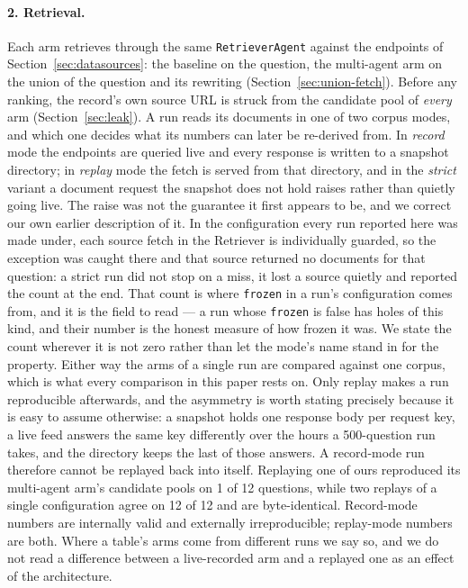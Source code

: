 \documentclass[acmsmall,anonymous,screen]{acmart}
\begin{document}
\paragraph{2. Retrieval.} Each arm retrieves through the same
\texttt{RetrieverAgent} against the endpoints of
Section~\ref{sec:datasources}: the baseline on the question, the multi-agent
arm on the union of the question and its rewriting
(Section~\ref{sec:union-fetch}). Before any ranking, the record's own source
URL is struck from the candidate pool of \emph{every} arm
(Section~\ref{sec:leak}). A run reads its documents in one of two corpus
modes, and which one decides what its numbers can later be re-derived from. In
\emph{record} mode the endpoints are queried live and every response is written
to a snapshot directory; in \emph{replay} mode the fetch is served from that
directory, and in the \emph{strict} variant a document request the snapshot
does not hold raises rather than quietly going live. The raise was not the
guarantee it first appears to be, and we correct our own earlier description of
it. In the configuration every run reported here was made under, each source
fetch in the Retriever is individually guarded, so the exception was caught
there and that source returned no documents for that question: a strict run did
not stop on a miss, it lost a source quietly and reported the count at the end.
That count is where \texttt{frozen} in a run's configuration comes from, and it
is the field to read --- a run whose \texttt{frozen} is false has holes of this
kind, and their number is the honest measure of how frozen it was. We state the
count wherever it is not zero rather than let the mode's name stand in for the
property. Either way the
arms of a single run are compared against one corpus, which is what every
comparison in this paper rests on. Only replay makes a run reproducible
afterwards, and the asymmetry is worth stating precisely because it is easy to
assume otherwise: a snapshot holds one response body per request key, a live
feed answers the same key differently over the hours a 500-question run takes,
and the directory keeps the last of those answers. A record-mode run therefore
cannot be replayed back into itself. Replaying one of ours reproduced its
multi-agent arm's candidate pools on 1 of 12 questions, while two replays of a
single configuration agree on 12 of 12 and are byte-identical. Record-mode
numbers are internally valid and externally irreproducible; replay-mode numbers
are both. Where a table's arms come from different runs we say so, and we do
not read a difference between a live-recorded arm and a replayed one as an
effect of the architecture.
\end{document}
